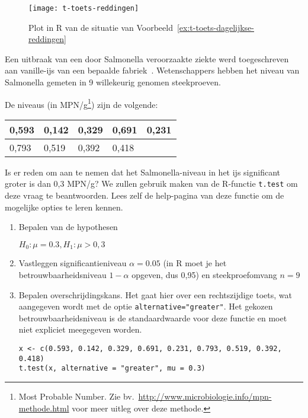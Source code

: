 \begin{figure}
  \centering
  \texttt{[image: t-toets-reddingen]}
  \caption{Plot in R van de situatie van Voorbeeld~\ref{ex:t-toets-dagelijkse-reddingen}}
\end{figure}

\begin{example}
  Een uitbraak van een door Salmonella veroorzaakte ziekte werd toegeschreven aan vanille-ijs van een bepaalde fabriek~\autocite{Lindquist}. Wetenschappers hebben het niveau van Salmonella gemeten in 9 willekeurig genomen steekproeven.
  
  De niveaus (in MPN/g\footnote{Most Probable Number. Zie bv.~\url{http://www.microbiologie.info/mpn-methode.html} voor meer uitleg over deze methode.}) zijn de volgende:
  
    \begin{center}
    \begin{tabular}{|l|l|l|l|l|}
      \hline
      0,593 & 0,142 & 0,329 & 0,691 & 0,231 \\ \hline
      0,793 & 0,519 & 0,392 & 0,418 &       \\ \hline
    \end{tabular}
  \end{center}

  Is er reden om aan te nemen dat het Salmonella-niveau in het ijs significant groter is dan 0,3 MPN/g? We zullen gebruik maken van de R-functie \texttt{t.test} om deze vraag te beantwoorden. Lees zelf de help-pagina van deze functie om de mogelijke opties te leren kennen.
  
  \begin{enumerate}
    \item Bepalen van de hypothesen
    
    $H_0: \mu = 0.3, H_1: \mu > 0,3$
    
    \item Vastleggen significantieniveau $\alpha = 0.05$ (in R moet je het betrouwbaarheidsniveau $1-\alpha$ opgeven, dus 0,95) en steekproefomvang $n = 9$
    
    \item Bepalen overschrijdingskans. Het gaat hier over een rechtszijdige toets, wat aangegeven wordt met de optie \texttt{alternative="greater"}. Het gekozen betrouwbaarheidsniveau is de standaardwaarde voor deze functie en moet niet expliciet meegegeven worden.
    
\begin{lstlisting}
x <- c(0.593, 0.142, 0.329, 0.691, 0.231, 0.793, 0.519, 0.392, 0.418)
t.test(x, alternative = "greater", mu = 0.3)
\end{lstlisting}
    

\end{enumerate}
\end{example}
